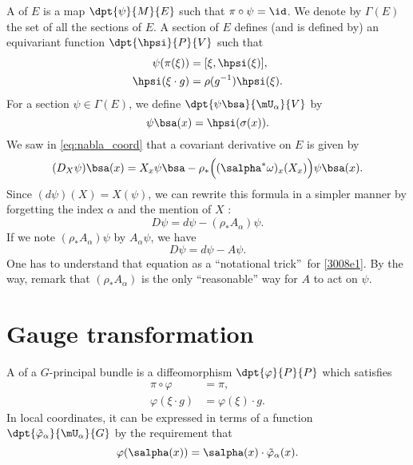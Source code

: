 A  of $E$ is a map $\dpt{\psi}{M}{E}$ such that $\pi\circ\psi=\id$. We denote by $\Gamma(E)$ the set of all the sections of $E$. A section of $E$ defines (and is defined by) an equivariant function $\dpt{\hpsi}{P}{V}$ such that
\begin{subequations}
\begin{align}
  \psi(\pi(\xi))&=[\xi,\hpsi(\xi)],\\
  \hpsi(\xi\cdot g)&=\rho(g^{-1})\hpsi(\xi).
\end{align}
\end{subequations}
For a section $\psi\in\Gamma(E)$, we define $\dpt{\psi\bsa}{\mU_{\alpha}}{V}$ by
 \[
 \psi\bsa(x)=\hpsi(\sigma(x)).
 \]
We saw in \eqref{eq:nabla_coord} that a covariant derivative on $E$ is given by
\begin{equation}\label{3008e1}
  (D_X\psi)\bsa(x)=X_x\psi\bsa-\rho_*\Big((\salpha^*\omega)_x(X_x)\Big)\psi\bsa(x).
\end{equation}
Since $(d\psi)(X)=X(\psi)$, we can rewrite this formula in a simpler manner by forgetting the index $\alpha$ and the mention of $X$ :
\[
    D\psi=d\psi-(\rho_*A_{\alpha})\psi.
\]
If we note $(\rho_*A_{\alpha})\psi$ by $A_{\alpha}\psi$, we have
\begin{equation}
        D\psi=d\psi-A\psi.
\end{equation}
One has to understand that equation as a ``notational trick''\ for \eqref{3008e1}. By the way, remark that $(\rho_*A_{\alpha})$ is the only ``reasonable'' way for $A$ to act on $\psi$.

\section{Gauge transformation}

A  of a $G$-principal bundle is a diffeomorphism $\dpt{\varphi}{P}{P}$ which satisfies
\begin{subequations}
\begin{align}
   \pi\circ\varphi&=\pi,\\
   \varphi(\xi\cdot g)&=\varphi(\xi)\cdot g.
\end{align}
\end{subequations}
In local coordinates, it can be expressed in terms of a function $\dpt{\tilde{\varphi}_{\alpha}}{\mU_{\alpha}}{G}$ by the requirement that
\begin{equation}\label{def_vpt}
    \varphi(\salpha(x))=\salpha(x)\cdot\tilde{\varphi}_{\alpha}(x).
\end{equation}

